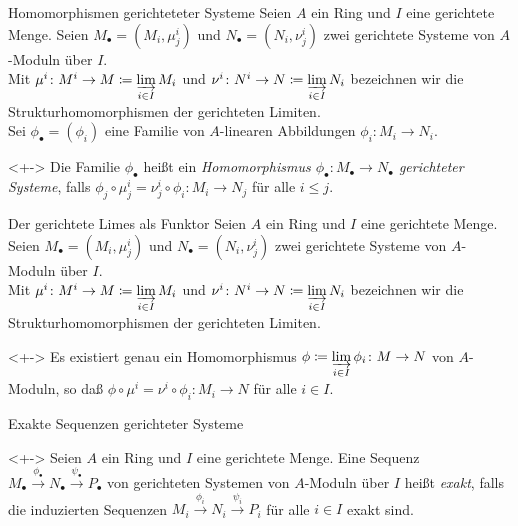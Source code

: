 \begin{frame}{Homomorphismen gerichteteter Systeme}
	Seien \(A\) ein Ring und \(I\) eine gerichtete Menge. Seien \(M_\bullet
	= (M_i, \mu^i_j)\) und \(N_\bullet = (N_i, \nu^i_j)\) zwei gerichtete Systeme
	von \(A\)-Moduln über \(I\).
	\\
	Mit \(\mu^i\colon M^i \to M \coloneqq \varinjlim\limits_{i \in I} M_i\)
	und \(\nu^i\colon N^i \to N \coloneqq \varinjlim\limits_{i \in I} N_i\)
	bezeichnen wir die Strukturhomomorphismen der gerichteten Limiten.
	\\
	Sei \(\phi_\bullet = (\phi_i)\) eine Familie von \(A\)-linearen Abbildungen
	\(\phi_i\colon M_i \to N_i\).
	\begin{definition}<+->
		Die Familie \(\phi_\bullet\) heißt ein \emph{Homomorphismus
		\(\phi_\bullet\colon M_\bullet \to N_\bullet\) gerichteter Systeme}, falls
		\(\phi_j \circ \mu_j^i = \nu_j^i \circ \phi_i\colon M_i \to N_j\) für
		alle \(i \le j\).
	\end{definition}
\end{frame}

\begin{frame}{Der gerichtete Limes als Funktor}
	Seien \(A\) ein Ring und \(I\) eine gerichtete Menge. Seien \(M_\bullet
	= (M_i, \mu^i_j)\) und \(N_\bullet = (N_i, \nu^i_j)\) zwei gerichtete Systeme
	von \(A\)-Moduln über \(I\).
	\\
	Mit \(\mu^i\colon M^i \to M \coloneqq \varinjlim\limits_{i \in I} M_i\)
	und \(\nu^i\colon N^i \to N \coloneqq \varinjlim\limits_{i \in I} N_i\)
	bezeichnen wir die Strukturhomomorphismen der gerichteten Limiten.
	\begin{proposition}<+->
		Es existiert genau ein Homomorphismus \(\phi \coloneqq \varinjlim\limits_{i \in I}
		\phi_i\colon M \to N\) von \(A\)-Moduln, so daß
		\(\phi \circ \mu^i = \nu^i \circ \phi_i\colon M_i \to N\) für alle \(i \in I\).
		\qedhere
	\end{proposition}
\end{frame}

\begin{frame}{Exakte Sequenzen gerichteter Systeme}
	\begin{definition}<+->
		Seien \(A\) ein Ring und \(I\) eine gerichtete Menge. Eine Sequenz
		\(M_\bullet \xrightarrow{\phi_\bullet} N_\bullet \xrightarrow{\psi_\bullet}
		P_\bullet\) von gerichteten Systemen von \(A\)-Moduln über \(I\) heißt
		\emph{exakt}, falls die induzierten Sequenzen
		\(M_i \xrightarrow{\phi_i} N_i \xrightarrow{\psi_i} P_i\) für alle
		\(i \in I\) exakt sind.
	\end{definition}
\end{frame}

